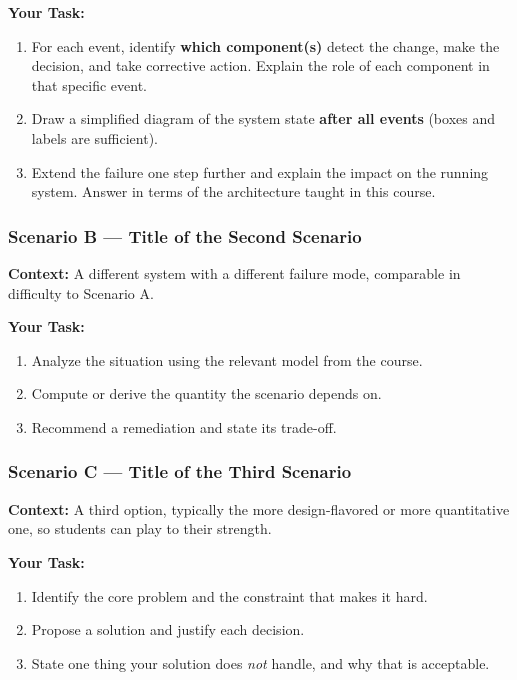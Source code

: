 \textbf{Your Task:}

\begin{enumerate}[label=(\alph*)]
\item For each event, identify \textbf{which component(s)} detect the change,
make the decision, and take corrective action. Explain the role of each
component in that specific event.

\item Draw a simplified diagram of the system state \textbf{after all events}
(boxes and labels are sufficient).

\item Extend the failure one step further and explain the impact on the
running system. Answer in terms of the architecture taught in this course.
\end{enumerate}

\vspace{120mm}

\newpage
\subsubsection*{Scenario B --- Title of the Second Scenario}

\textbf{Context:}
A different system with a different failure mode, comparable in difficulty
to Scenario A.

\textbf{Your Task:}

\begin{enumerate}[label=(\alph*)]
\item Analyze the situation using the relevant model from the course.
\item Compute or derive the quantity the scenario depends on.
\item Recommend a remediation and state its trade-off.
\end{enumerate}

\vspace{120mm}

\newpage
\subsubsection*{Scenario C --- Title of the Third Scenario}

\textbf{Context:}
A third option, typically the more design-flavored or more quantitative one,
so students can play to their strength.

\textbf{Your Task:}

\begin{enumerate}[label=(\alph*)]
\item Identify the core problem and the constraint that makes it hard.
\item Propose a solution and justify each decision.
\item State one thing your solution does \textit{not} handle, and why that is acceptable.
\end{enumerate}

\vspace{120mm}
